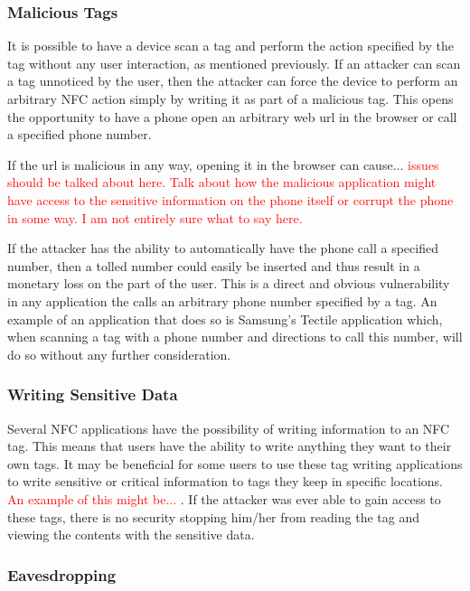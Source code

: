 \documentclass[12pt]{article}
\newcommand\TODO[1]{\textcolor{red}{#1}}
\begin{document}
\subsubsection{Malicious Tags}
It is possible to have a device scan a tag and perform the action specified by the tag without any user interaction, as mentioned previously. If an attacker can scan a tag unnoticed by the user, then the attacker can force the device to perform an arbitrary NFC action simply by writing it as part of a malicious tag. This opens the opportunity to have a phone open an arbitrary web url in the browser or call a specified phone number. 

If the url is malicious in any way, opening it in the browser can cause... \TODO{issues should be talked about here. Talk about how the malicious application might have access to the sensitive information on the phone itself or corrupt the phone in some way. I am not entirely sure what to say here.} 

If the attacker has the ability to automatically have the phone call a specified number, then a tolled number could easily be inserted and thus result in a monetary loss on the part of the user. This is a direct and obvious vulnerability in any application the calls an arbitrary phone number specified by a tag. An example of an application that does so is Samsung's Tectile application which, when scanning a tag with a phone number and directions to call this number, will do so without any further consideration. 

\subsubsection{Writing Sensitive Data}
Several NFC applications have the possibility of writing information to an NFC tag. This means that users have the ability to write anything they want to their own tags. It may be beneficial for some users to use these tag writing applications to write sensitive or critical information to tags they keep in specific locations. \TODO{An example of this might be... }. If the attacker was ever able to gain access to these tags, there is no security stopping him/her from reading the tag and viewing the contents with the sensitive data. 

\subsubsection{Eavesdropping}
\end{document}
